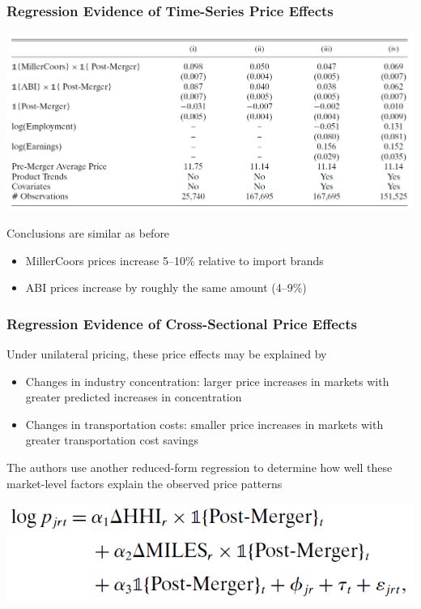 \documentclass{beamer}
\begin{document}
\begin{frame}\frametitle{Regression Evidence of Time-Series Price Effects}
    \begin{center}
        \includegraphics[width=0.95\linewidth]{table_2}
    \end{center}
    Conclusions are similar as before
    \begin{itemize}
        \item MillerCoors prices increase 5--10\% relative to import brands
        \item ABI prices increase by roughly the same amount (4--9\%)
    \end{itemize}
\end{frame}

\begin{frame}\frametitle{Regression Evidence of Cross-Sectional Price Effects}
    Under unilateral pricing, these price effects may be explained by
    \begin{itemize}
        \item Changes in industry concentration: larger price increases in markets with greater predicted increases in concentration
        \item Changes in transportation costs: smaller price increases in markets with greater transportation cost savings
    \end{itemize}
    \vspace{2ex}
    The authors use another reduced-form regression to determine how well these market-level factors explain the observed price patterns
    \vspace{2ex}
    \begin{center}
        \includegraphics[width=0.5\linewidth]{eq_2}
    \end{center}
\end{frame}
\end{document}
